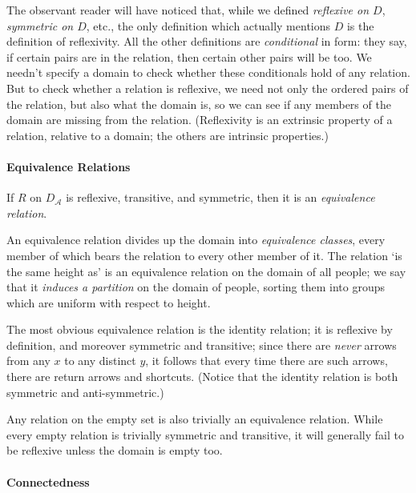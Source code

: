 The observant reader will have noticed that, while we defined \emph{reflexive on $D$}, \emph{symmetric on $D$}, etc., the only definition which actually mentions $D$ is the definition of reflexivity. All the other definitions are \emph{conditional} in form: they say, if certain pairs are in the relation, then certain other pairs will be too. We needn't specify a domain to check whether these conditionals hold of any relation. But to check whether a relation is reflexive, we need not only the ordered pairs of the relation, but also what the domain is, so we can see if any members of the domain are missing from the relation. (Reflexivity is an extrinsic property of a relation, relative to a domain; the others are intrinsic properties.)


\paragraph{Equivalence Relations}

\begin{definition}
	If $R$ on $D_{\mathscr{A}}$ is reflexive, transitive, and symmetric, then it is an \emph{equivalence relation}. 
\end{definition}

An equivalence relation divides up the domain into \emph{equivalence classes}, every member of which bears the relation to every other member of it. The relation `is the same height as' is an equivalence relation on the domain of all people; we say that it \emph{induces a partition} on the domain of people, sorting them into groups which are uniform with respect to height.

The most obvious equivalence relation is the identity relation; it is reflexive by definition, and moreover symmetric and transitive; since there are \emph{never} arrows from any $x$ to any distinct $y$, it follows that every time there are such arrows, there are return arrows and shortcuts. (Notice that the identity relation is both symmetric and anti-symmetric.)

Any relation on the empty set is also trivially an equivalence relation. While every empty relation is trivially symmetric and transitive, it will generally fail to be reflexive unless the domain is empty too.

\paragraph{Connectedness}

